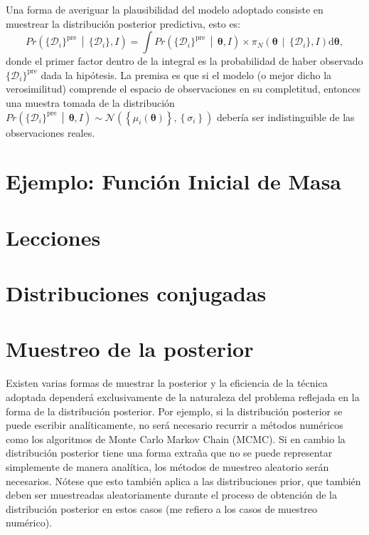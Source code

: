 \documentclass[a4paper,twoside]{article}
\newcommand{\hip}{\ensuremath{\mathbold{\theta}}\xspace}
\newcommand{\dat}{\ensuremath{\{\mathcal{D}_i\}}\xspace}
\newcommand{\pos}[2]{\ensuremath{\pi_N\left(#1\,\middle|\, #2\right)}\xspace}
\newcommand{\pro}[2]{\ensuremath{Pr\left(#1\,\middle|\, #2\right)}\xspace}
\newcommand{\set}[1]{\ensuremath{\left\{#1\right\}}\xspace}
\begin{document}
Una forma de averiguar la plausibilidad del modelo adoptado consiste en muestrear la distribución
posterior predictiva, esto es:
%
\begin{equation}
\pro{\dat^\text{pre}}{\dat,I} = \int\pro{\dat^\text{pre}}{\hip,I}\times\pos{\hip}{\dat,I}\text{d}\hip,
\end{equation}
%
donde el primer factor dentro de la integral es la probabilidad de haber observado
\(\dat^\text{pre}\) dada la hipótesis. La premisa es que si el modelo (o mejor dicho la
verosimilitud) comprende el espacio de observaciones en su completitud, entonces una muestra tomada
de la distribución
\(\pro{\dat^\text{pre}}{\hip,I}\sim\mathcal{N}(\set{\mu_i(\hip)},\set{\sigma_i})\) debería ser
indistinguible de las observaciones reales.



\section{Ejemplo: Función Inicial de Masa}


\section{Lecciones}

\appendix

\section{Distribuciones conjugadas}\label{sc:conjugate-pdf}


\section{Muestreo de la posterior}

Existen varias formas de muestrar la posterior y la eficiencia de la técnica adoptada dependerá
exclusivamente de la naturaleza del problema reflejada en la forma de la distribución posterior. Por
ejemplo, si la distribución posterior se puede escribir analíticamente, no será necesario recurrir a
métodos numéricos como los algoritmos de Monte Carlo Markov Chain (MCMC). Si en cambio la
distribución posterior tiene una forma extraña que no se puede representar simplemente de manera
analítica, los métodos de muestreo aleatorio serán necesarios. Nótese que esto también aplica a las
distribuciones prior, que también deben ser muestreadas aleatoriamente durante el proceso de
obtención de la distribución posterior en estos casos (me refiero a los casos de muestreo numérico).
\end{document}

